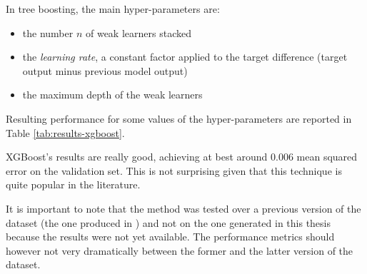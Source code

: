 In tree boosting, the main hyper-parameters are:
\begin{itemize}
    \item the number $n$ of weak learners stacked
    \item the \textit{learning rate}, a constant factor applied to the target difference (target output minus previous model output)
    \item the maximum depth of the weak learners
\end{itemize}

Resulting performance for some values of the hyper-parameters are reported in Table \ref{tab:results-xgboost}.

XGBoost's results are really good, achieving at best around 0.006 mean squared error on the validation set. This is not surprising given that this technique is quite popular in the literature. 

It is important to note that the method was tested over a previous version of the dataset (the one produced in \cite{carlas-thesis}) and not on the one generated in this thesis because the results were not yet available. The performance metrics should however not very dramatically between the former and the latter version of the dataset.

